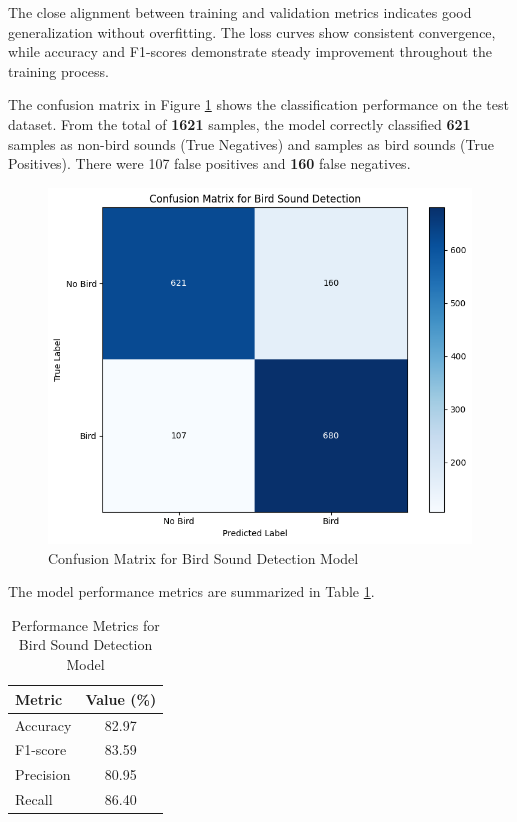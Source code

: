 The close alignment between training and validation metrics indicates good generalization without overfitting. The loss curves show consistent convergence, while accuracy and F1-scores demonstrate steady improvement throughout the training process.

The confusion matrix in Figure \ref{fig:Confusion Matrix for Detection Model} shows the classification performance on the test dataset. From the total of \textbf{1621} samples, the model correctly classified \textbf{621} samples as non-bird sounds (True Negatives) and  samples as bird sounds (True Positives). There were 107 false positives and \textbf{160} false negatives.
\begin{figure}[h!]
      \centering
      \includegraphics[scale=0.75]{images/detection_cm.png}
      \caption{Confusion Matrix for Bird Sound Detection Model}
      \label{fig:Confusion Matrix for Detection Model}
\end{figure}
The model performance metrics are summarized in Table \ref{tab:detection_metrics}.

\begin{table}[h]
      \centering
      \caption{Performance Metrics for Bird Sound Detection Model}
      \label{tab:detection_metrics}
      \begin{tabular}{|l|c|}
            \hline
            \textbf{Metric} & \textbf{Value (\%)} \\
            \hline
            Accuracy & 82.97 \\
            F1-score & 83.59 \\
            Precision & 80.95 \\
            Recall & 86.40 \\
            \hline
      \end{tabular}
\end{table}

